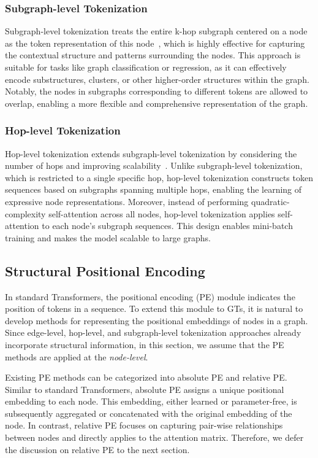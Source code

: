 \subsubsection{Subgraph-level Tokenization}
Subgraph-level tokenization treats the entire k-hop subgraph centered on a node as the token representation of this node~\cite{chen2022structure}, which is highly effective for capturing the contextual structure and patterns surrounding the nodes. 
This approach is suitable for tasks like graph classification or regression, as it can effectively encode substructures, clusters, or other higher-order structures within the graph.
Notably, the nodes in subgraphs corresponding to different tokens are allowed to overlap, enabling a more flexible and comprehensive representation of the graph. 


\subsubsection{Hop-level Tokenization}
Hop-level tokenization extends subgraph-level tokenization by considering the number of hops and improving scalability~\cite{NAGphormer, zhang2020graph, NAGphormer+}. Unlike subgraph-level tokenization, which is restricted to a single specific hop, hop-level tokenization constructs token sequences based on subgraphs spanning multiple hops, enabling the learning of expressive node representations.
Moreover, instead of performing quadratic-complexity self-attention across all nodes, hop-level tokenization applies self-attention to each node's subgraph sequences. This design enables mini-batch training and makes the model scalable to large graphs.


\subsection{Structural Positional Encoding}
\label{architecture:PE}

In standard Transformers, the positional encoding (PE) module indicates the position of tokens in a sequence. To extend this module to GTs, 
 it is natural to develop methods for representing the positional embeddings of nodes in a graph. Since edge-level, hop-level, and subgraph-level tokenization approaches already incorporate structural information, in this section, we assume that the PE methods are applied at the \emph{node-level}.

Existing PE methods can be categorized into absolute PE and relative PE. 
Similar to standard Transformers, absolute PE assigns a unique positional embedding to each node.
This embedding, either learned or parameter-free, is subsequently aggregated or concatenated with the original embedding of the node. 
In contrast, relative PE focuses on capturing pair-wise relationships between nodes and directly applies to  the attention matrix. Therefore, we defer the discussion on relative PE to the next section. 

